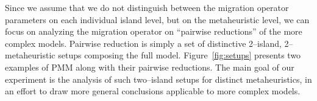 \documentclass{sig-alternate}
\begin{document}
    Since we assume that we do not distinguish between the migration operator parameters on each individual island level, but on the metaheuristic level, we can focus on analyzing the migration operator on ``pairwise reductions'' of the more complex models.
    Pairwise reduction is simply a set of distinctive 2--island, 2--metaheuristic setups composing the full model.
    Figure~\ref{fig:setups} presents two examples of PMM along with their pairwise reductions.
    The main goal of our experiment is the analysis of such two--island setups for distinct metaheuristics, in an effort to draw more general conclusions applicable to more complex models.

\end{document}
